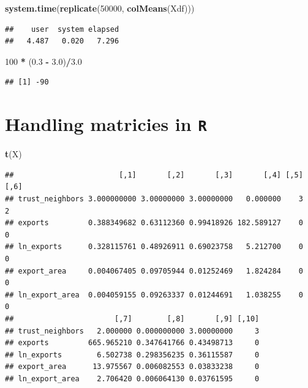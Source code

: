 \documentclass[]{book}
\newenvironment{Shaded}{\begin{snugshade}}{\end{snugshade}}
\newcommand{\KeywordTok}[1]{\textcolor[rgb]{0.13,0.29,0.53}{\textbf{#1}}}
\newcommand{\DecValTok}[1]{\textcolor[rgb]{0.00,0.00,0.81}{#1}}
\newcommand{\FloatTok}[1]{\textcolor[rgb]{0.00,0.00,0.81}{#1}}
\newcommand{\StringTok}[1]{\textcolor[rgb]{0.31,0.60,0.02}{#1}}
\newcommand{\OperatorTok}[1]{\textcolor[rgb]{0.81,0.36,0.00}{\textbf{#1}}}
\newcommand{\NormalTok}[1]{#1}
\theoremstyle{definition}
\theoremstyle{definition}
\theoremstyle{definition}
\theoremstyle{remark}
\begin{document}
\begin{Shaded}
\begin{Highlighting}[]
\KeywordTok{system.time}\NormalTok{(}\KeywordTok{replicate}\NormalTok{(}\DecValTok{50000}\NormalTok{, }\KeywordTok{colMeans}\NormalTok{(Xdf)))}
\end{Highlighting}
\end{Shaded}

\begin{verbatim}
##    user  system elapsed 
##   4.487   0.020   7.296
\end{verbatim}

\begin{Shaded}
\begin{Highlighting}[]
\DecValTok{100} \OperatorTok{*}\StringTok{ }\NormalTok{(}\FloatTok{0.3} \OperatorTok{-}\StringTok{ }\FloatTok{3.0}\NormalTok{)}\OperatorTok{/}\FloatTok{3.0}
\end{Highlighting}
\end{Shaded}

\begin{verbatim}
## [1] -90
\end{verbatim}

\section{\texorpdfstring{Handling matricies in
\texttt{R}}{Handling matricies in R}}\label{handling-matricies-in-r}

\begin{Shaded}
\begin{Highlighting}[]
\KeywordTok{t}\NormalTok{(X)}
\end{Highlighting}
\end{Shaded}

\begin{verbatim}
##                        [,1]       [,2]       [,3]       [,4] [,5] [,6]
## trust_neighbors 3.000000000 3.00000000 3.00000000   0.000000    3    2
## exports         0.388349682 0.63112360 0.99418926 182.589127    0    0
## ln_exports      0.328115761 0.48926911 0.69023758   5.212700    0    0
## export_area     0.004067405 0.09705944 0.01252469   1.824284    0    0
## ln_export_area  0.004059155 0.09263337 0.01244691   1.038255    0    0
##                       [,7]        [,8]       [,9] [,10]
## trust_neighbors   2.000000 0.000000000 3.00000000     3
## exports         665.965210 0.347641766 0.43498713     0
## ln_exports        6.502738 0.298356235 0.36115587     0
## export_area      13.975567 0.006082553 0.03833238     0
## ln_export_area    2.706420 0.006064130 0.03761595     0
\end{verbatim}
\end{document}
